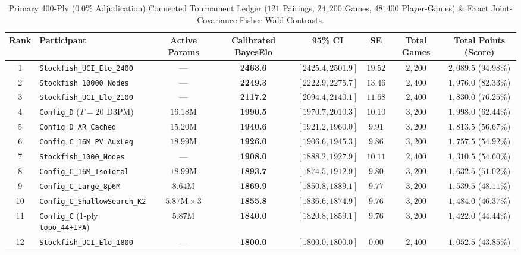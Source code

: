 \documentclass[10pt]{article}
\begin{document}
\begin{table}[h!]
\centering
\scriptsize
\caption{Primary 400-Ply ($0.0\%$ Adjudication) Connected Tournament Ledger ($121$ Pairings, $24{,}200$ Games, $48{,}400$ Player-Games) \& Exact Joint-Covariance Fisher Wald Contrasts.}
\begin{tabular}{clcccccc}
\toprule
Rank & Participant & Active Params & Calibrated BayesElo & 95\% CI & SE & Total Games & Total Points (Score) \\
\midrule
1 & \texttt{Stockfish\_UCI\_Elo\_2400} & --- & \textbf{2463.6} & $[2425.4, 2501.9]$ & $19.52$ & $2{,}200$ & $2{,}089.5$ ($94.98\%$) \\
2 & \texttt{Stockfish\_10000\_Nodes} & --- & \textbf{2249.3} & $[2222.9, 2275.7]$ & $13.46$ & $2{,}400$ & $1{,}976.0$ ($82.33\%$) \\
3 & \texttt{Stockfish\_UCI\_Elo\_2100} & --- & \textbf{2117.2} & $[2094.4, 2140.1]$ & $11.68$ & $2{,}400$ & $1{,}830.0$ ($76.25\%$) \\
4 & \texttt{Config\_D} ($T=20$ D3PM) & $16.18\text{M}$ & \textbf{1990.5} & $[1970.7, 2010.3]$ & $10.10$ & $3{,}200$ & $1{,}998.0$ ($62.44\%$) \\
5 & \texttt{Config\_D\_AR\_Cached} & $15.20\text{M}$ & \textbf{1940.6} & $[1921.2, 1960.0]$ & $9.91$ & $3{,}200$ & $1{,}813.5$ ($56.67\%$) \\
6 & \texttt{Config\_C\_16M\_PV\_AuxLeg} & $18.99\text{M}$ & \textbf{1926.0} & $[1906.6, 1945.3]$ & $9.86$ & $3{,}200$ & $1{,}757.5$ ($54.92\%$) \\
7 & \texttt{Stockfish\_1000\_Nodes} & --- & \textbf{1908.0} & $[1888.2, 1927.9]$ & $10.11$ & $2{,}400$ & $1{,}310.5$ ($54.60\%$) \\
8 & \texttt{Config\_C\_16M\_IsoTotal} & $18.99\text{M}$ & \textbf{1893.7} & $[1874.5, 1912.9]$ & $9.80$ & $3{,}200$ & $1{,}632.5$ ($51.02\%$) \\
9 & \texttt{Config\_C\_Large\_8p6M} & $8.64\text{M}$ & \textbf{1869.9} & $[1850.8, 1889.1]$ & $9.77$ & $3{,}200$ & $1{,}539.5$ ($48.11\%$) \\
10 & \texttt{Config\_C\_ShallowSearch\_K2} & $5.87\text{M}\times 3$ & \textbf{1855.8} & $[1836.6, 1874.9]$ & $9.76$ & $3{,}200$ & $1{,}484.0$ ($46.37\%$) \\
11 & \texttt{Config\_C} (1-ply \texttt{topo\_44+IPA}) & $5.87\text{M}$ & \textbf{1840.0} & $[1820.8, 1859.1]$ & $9.76$ & $3{,}200$ & $1{,}422.0$ ($44.44\%$) \\
12 & \texttt{Stockfish\_UCI\_Elo\_1800} & --- & \textbf{1800.0} & $[1800.0, 1800.0]$ & $0.00$ & $2{,}400$ & $1{,}052.5$ ($43.85\%$) \\

\end{tabular}
\end{table}
\end{document}
